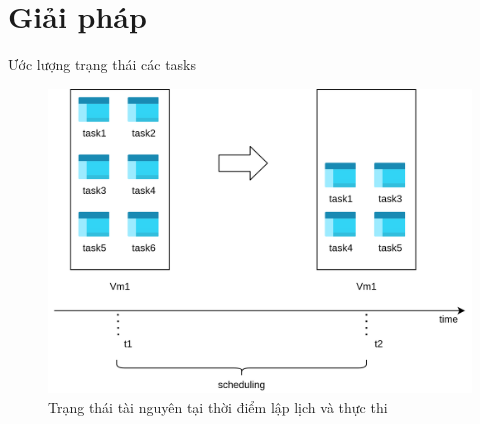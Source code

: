 \documentclass[11pt,xcolor={dvipsnames}, aspectratio=169]{beamer}
\begin{document}

\section{Giải pháp} 

\begin{frame}
{Ước lượng trạng thái các tasks}
\pause
\begin{figure}
	\centering
	\includegraphics[scale=0.5]{images/predicting_status1.png}
	\caption{Trạng thái tài nguyên tại thời điểm lập lịch và thực thi}
\end{figure}
\end{frame}

\end{document}

